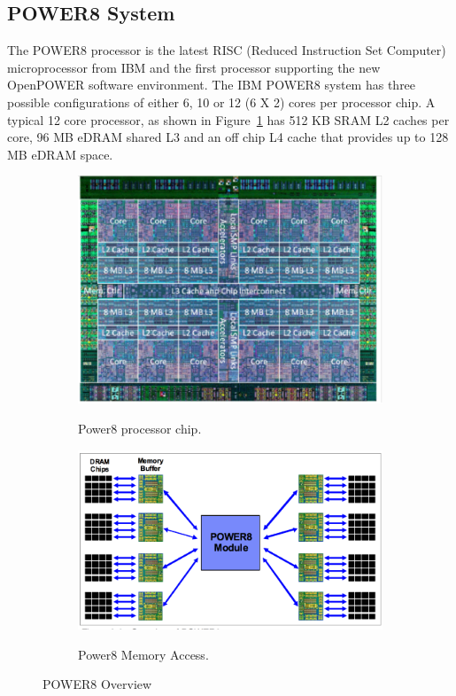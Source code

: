 \subsection{POWER8 System}
The POWER8 processor is the latest RISC (Reduced Instruction Set Computer) microprocessor from IBM and the first processor supporting the new OpenPOWER software environment. 
The IBM POWER8 system has three possible configurations of either 6, 10 or 12 (6 X 2) cores per processor chip. A typical 12 core processor, as shown in Figure~\ref{fig:p8_1} has  512 KB SRAM L2 caches per core, 96 MB eDRAM shared L3 and an off chip L4 cache that provides up to 128 MB eDRAM space. 
\begin{figure}
    \centering
    \begin{subfigure}[b]{0.4\textwidth}
         {\includegraphics[width=1.0\textwidth]{./Images/P8.pdf}}
	 \caption{Power8 processor chip.~\cite{IBM_P8}}
 	 \label{fig:p8_1}
    \end{subfigure}
     \centering
    \begin{subfigure}[b]{0.4\textwidth}
         {\includegraphics[height=0.7\textwidth]{./Images/P8_memory.pdf}}
	 \caption{Power8 Memory Access.~\cite{IBM_P8}}
	  \label{fig:p8_2}
    \end{subfigure}
  \caption{POWER8 Overview}\label{fig:POWER8}
\end{figure}
